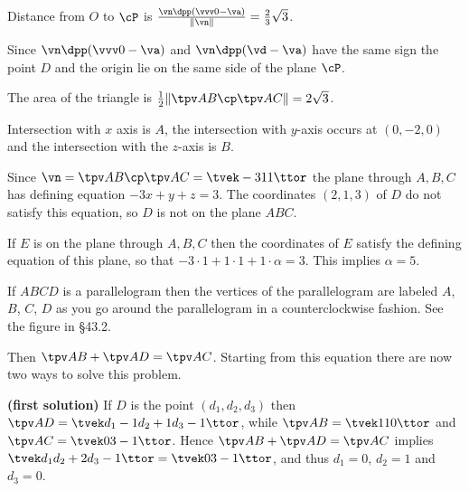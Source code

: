 Distance from $O$ to $\cP$ is $\frac{\vn\dpp(\vvv0-\va)}{\|\vn\|} =
\frac23\sqrt{3}$.
\bigskip

\item[{\bfseries(VI13.5d)}]

Since $\vn\dpp(\vvv0-\va)$ and $\vn\dpp(\vd-\va)$ have the same sign the point
$D$ and the origin lie on the same side of the plane $\cP$.
\bigskip

\item[{\bfseries(VI13.5e)}]

The area of the triangle is $\frac12\|\tpv AB\cp\tpv AC\| = 2\sqrt{3}$.
\bigskip

\item[{\bfseries(VI13.5f)}]

Intersection with $x$ axis is $A$, the intersection with $y$-axis occurs at
$(0,-2,0)$ and the intersection with the $z$-axis is $B$.
\bigskip

\item[{\bfseries(VI13.6a)}]

Since $\vn = \tpv AB\cp\tpv AC = \tvek-3\\1\\1\ttor$ the plane through
$A,B,C$ has defining equation $-3x+y+z = 3$.  The coordinates $(2,1,3)$ of
$D$ do not satisfy this equation, so $D$ is not on the plane $ABC$.
\bigskip

\item[{\bfseries(VI13.6b)}]

If $E$ is on the plane through $A,B,C$ then the coordinates of $E$ satisfy the
defining equation of this plane, so that $-3\cdot1+1\cdot1+1\cdot\alpha = 3$.
This implies $\alpha=5$.
\bigskip

\item[{\bfseries(VI13.7a)}]

If $ABCD$ is a parallelogram then the vertices of the parallelogram are labeled
$A$, $B$, $C$, $D$ as you go around the parallelogram in a counterclockwise
fashion. See the figure in \S43.2.

Then $\tpv AB + \tpv AD = \tpv AC$.  Starting from this equation there
are now two ways to solve this problem.

\textbf{(first solution)}  If $D$ is the point $(d_1, d_2, d_3)$ then $\tpv AD =
\tvek d_1-1 \\d_2+1\\d_3-1\ttor$, while $\tpv AB = \tvek1\\1\\0\ttor$ and $\tpv
AC = \tvek0\\3\\-1\ttor$. Hence $\tpv AB + \tpv AD = \tpv AC$ implies
$\tvek d_1 \\d_2+2 \\d_3-1\ttor = \tvek0\\3\\-1\ttor$, and thus
$d_1 = 0$, $d_2 = 1$ and $d_3 = 0$.

